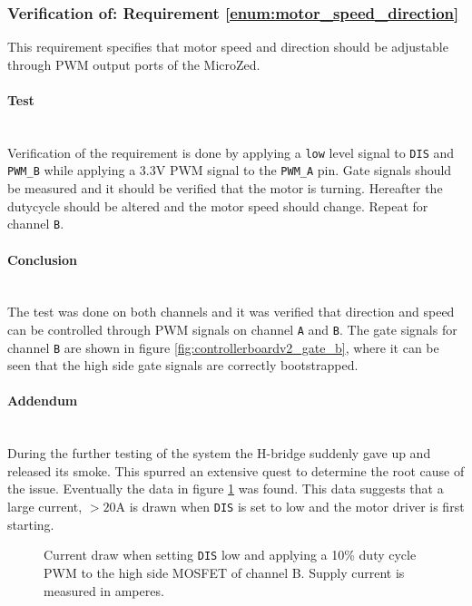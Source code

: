 \subsubsection{Verification of: Requirement \ref{enum:motor_speed_direction}} %
\label{subs:requirement_enum:motor_speed_direction}
This requirement specifies that motor speed and direction should be adjustable through PWM output ports of the MicroZed.

\paragraph{Test}~\\
Verification of the requirement is done by applying a \texttt{low} level signal to \texttt{DIS} and \texttt{PWM\_B} while applying a 3.3V PWM signal to the \texttt{PWM\_A} pin.
Gate signals should be measured and it should be verified that the motor is turning.
Hereafter the dutycycle should be altered and the motor speed should change.
Repeat for channel \texttt{B}.

\paragraph{Conclusion}~\\
The test was done on both channels and it was verified that direction and speed can be controlled through PWM signals on channel \texttt{A} and \texttt{B}.
The gate signals for channel \texttt{B} are shown in figure \ref{fig:controllerboardv2_gate_b}, where it can be seen that the high side gate signals are correctly bootstrapped.

\paragraph{Addendum}~\\
During the further testing of the system the H-bridge suddenly gave up and released its smoke.
This spurred an extensive quest to determine the root cause of the issue.
Eventually the data in figure \ref{fig:current_w_load} was found.
This data suggests that a large current, $>20$A is drawn when \texttt{DIS} is set to low and the motor driver is first starting.

\begin{figure}[h]
	\centering
	\caption{Current draw when setting \texttt{DIS} low and applying a 10\% duty cycle PWM to the high side MOSFET of channel B. Supply current is measured in amperes.}
	\label{fig:current_w_load}
\end{figure}

